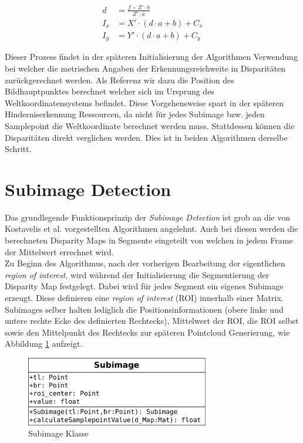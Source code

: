 \begin{equation}
  \label{eq:backward_calculation}
  \begin{aligned}
    d &= \frac{f- Z' \cdot b}{Z' \cdot a}\\
    I_x &= X' \cdot (d \cdot a + b) + C_x\\
    I_y &= Y' \cdot (d \cdot a + b) + C_y
  \end{aligned}
\end{equation}

\noindent
Dieser Prozess findet in der späteren Initialisierung der Algorithmen Verwendung bei welcher die metrischen Angaben der Erkennungsreichweite in Disparitäten zurückgerechnet werden. Als Referenz wir dazu die Position des Bildhauptpunktes berechnet welcher sich im Ursprung des Weltkoordinatensystems befindet. Diese Vorgehensweise spart in der späteren Hinderniserkennung Ressourcen, da nicht für jedes Subimage bzw. jeden Samplepoint die Weltkoordinate berechnet werden muss. Stattdessen können die Disparitäten direkt verglichen werden. Dies ist in beiden Algorithmen derselbe Schritt.\\

\section{Subimage Detection}
\label{sec:mean_disparity_detection}

Das grundlegende Funktionsprinzip der \emph{Subimage Detection} ist grob an die von Kostavelis et al. vorgestellten Algorithmen angelehnt. Auch bei diesen werden die berechneten Disparity Maps in Segmente eingeteilt von welchen in jedem Frame der Mittelwert errechnet wird.\\

\noindent
Zu Beginn des Algorithmus, nach der vorherigen Bearbeitung der eigentlichen \emph{region of interest}, wird während der Initialisierung die Segmentierung der Disparity Map festgelegt. Dabei wird für jedes Segment ein eigenes Subimage erzeugt. Diese definieren eine \emph{region of interest} (ROI) innerhalb einer Matrix. Subimages selber halten lediglich die Positionsinformationen (obere linke und untere rechte Ecke des definierten Rechtecks), Mittelwert der ROI, die ROI selbst sowie den Mittelpunkt des Rechtecks zur späteren Pointcloud Generierung, wie Abbildung \ref{fig:subimage_class} aufzeigt.

\begin{figure}[h]
	\begin{center}
		\includegraphics[width=8cm]{img/subimage_class.pdf}
	\end{center}
	\caption{Subimage Klasse}
	\label{fig:subimage_class}
\end{figure}

